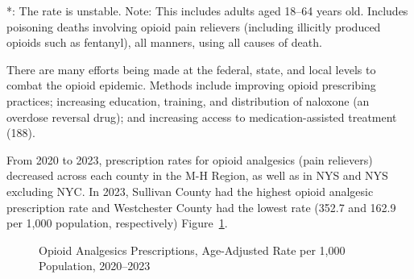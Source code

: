 \documentclass[
  english,
  letterpaper,
]{report}
\begin{document}
\begin{tcolorbox}[enhanced jigsaw, breakable, leftrule=.75mm, title=\textcolor{quarto-callout-note-color}{\faInfo}\hspace{0.5em}{Note}, bottomrule=.15mm, opacityback=0, left=2mm, colback=white, bottomtitle=1mm, coltitle=black, colbacktitle=quarto-callout-note-color!10!white, colframe=quarto-callout-note-color-frame, opacitybacktitle=0.6, toptitle=1mm, titlerule=0mm, arc=.35mm, rightrule=.15mm, toprule=.15mm]

*: The rate is unstable. Note: This includes adults aged 18--64 years
old. Includes poisoning deaths involving opioid pain relievers
(including illicitly produced opioids such as fentanyl), all manners,
using all causes of death.

\end{tcolorbox}

There are many efforts being made at the federal, state, and local
levels to combat the opioid epidemic. Methods include improving opioid
prescribing practices; increasing education, training, and distribution
of naloxone (an overdose reversal drug); and increasing access to
medication-assisted treatment (188).

From 2020 to 2023, prescription rates for opioid analgesics (pain
relievers) decreased across each county in the M-H Region, as well as in
NYS and NYS excluding NYC. In 2023, Sullivan County had the highest
opioid analgesic prescription rate and Westchester County had the lowest
rate (352.7 and 162.9 per 1,000 population, respectively)
Figure~\ref{fig-opioid-analgesic-rx-aar}.

\begin{figure}


\caption{\label{fig-opioid-analgesic-rx-aar}Opioid Analgesics
Prescriptions, Age-Adjusted Rate per 1,000 Population, 2020--2023}

\end{figure}%
\end{document}
